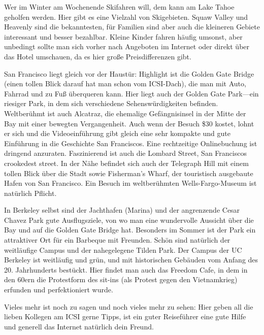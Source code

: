 \documentclass[a4paper]{scrreprt}
\begin{document}
Wer im Winter am Wochenende Skifahren will, dem kann am Lake Tahoe geholfen werden. Hier gibt es eine Vielzahl von Skigebieten. Squaw Valley und Heavenly sind die bekanntesten, für Familien sind aber auch die kleineren Gebiete interessant und besser bezahlbar. Kleine Kinder fahren häufig umsonst, aber unbedingt sollte man sich vorher nach Angeboten im Internet oder direkt über das Hotel umschauen, da es hier große Preisdifferenzen gibt.

San Francisco liegt gleich vor der Haustür: Highlight ist die Golden Gate Bridge (einen tollen Blick darauf hat man schon vom ICSI-Dach), die man mit Auto, Fahrrad und zu Fuß überqueren kann. Hier liegt auch der Golden Gate Park---ein riesiger Park, in dem sich verschiedene Sehenswürdigkeiten befinden. Weltberühmt ist auch Alcatraz, die ehemalige Gefängnisinsel in der Mitte der Bay mit einer bewegten Vergangenheit. Auch wenn der Besuch \$30 kostet, lohnt er sich und die Videoeinführung gibt gleich eine sehr kompakte und gute Einführung in die Geschichte San Franciscos. Eine rechtzeitige Onlinebuchung ist dringend anzuraten. Faszinierend ist auch die Lombard Street, San Franciscos crookedest street. In der Nähe befindet sich auch der Telegraph Hill mit einem tollen Blick über die Stadt sowie Fisherman's Wharf, der touristisch ausgebaute Hafen von San Francisco. Ein Besuch im weltberühmten Wells-Fargo-Museum ist natürlich Pflicht.

In Berkeley selbst sind der Jachthafen (Marina) und der angrenzende Cesar Chavez Park gute Ausflugsziele, von wo man eine wundervolle Aussicht über die Bay und auf die Golden Gate Bridge hat. Besonders im Sommer ist der Park ein attraktiver Ort für ein Barbeque mit Freunden. Schön sind natürlich der weitläufige Campus und der nahegelegene Tilden Park. Der Campus der UC Berkeley ist weitläufig und grün, und mit historischen Gebäuden vom Anfang des 20. Jahrhunderts bestückt. Hier findet man auch das Freedom Cafe, in dem in den 60ern die Protestform des sit-ins (als Protest gegen den Vietnamkrieg) erfunden und perfektioniert wurde.

Vieles mehr ist noch zu sagen und noch vieles mehr zu sehen: Hier geben all die lieben Kollegen am ICSI gerne Tipps, ist ein guter Reiseführer eine gute Hilfe und generell das Internet natürlich dein Freund.

\clearpage

 
\end{document}
